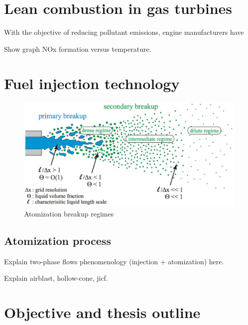 \section{Lean combustion in gas turbines}

With the objective of reducing pollutant emissions, engine manufacturers have 

Show graph NOx formation versus temperature.



\section{Fuel injection technology}

\begin{figure}[h!]
	\centering
	\includegraphics[scale=0.5]{./part0_intro/atomization-regimes-scheme}
	\caption{Atomization breakup regimes }
	\label{fig:atomization_regimes_herrmann}
\end{figure}

\subsection*{Atomization process}

Explain two-phase flows phenomenology (injection + atomization) here. 

Explain airblast, hollow-cone, jicf.

\section{Objective and thesis outline}

